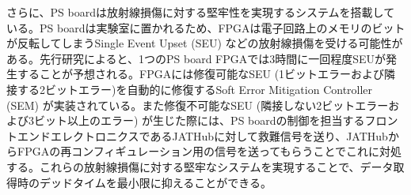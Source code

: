     さらに、PS boardは放射線損傷に対する堅牢性を実現するシステムを搭載している。PS boardは実験室に置かれるため、FPGAは電子回路上のメモリのビットが反転してしまうSingle Event Upset  (SEU) などの放射線損傷を受ける可能性がある。先行研究\cite{PSB_SEU}によると、1つのPS board FPGAでは3時間に一回程度SEUが発生することが予想される。FPGAには修復可能なSEU  (1ビットエラーおよび隣接する2ビットエラー)を自動的に修復するSoft Error Mitigation Controller  (SEM) が実装されている。また修復不可能なSEU  (隣接しない2ビットエラーおよび3ビット以上のエラー) が生じた際には、PS boardの制御を担当するフロントエンドエレクトロニクスであるJATHubに対して救難信号を送り、JATHubからFPGAの再コンフィギュレーション用の信号を送ってもらうことでこれに対処する。これらの放射線損傷に対する堅牢なシステムを実現することで、データ取得時のデッドタイムを最小限に抑えることができる。    


